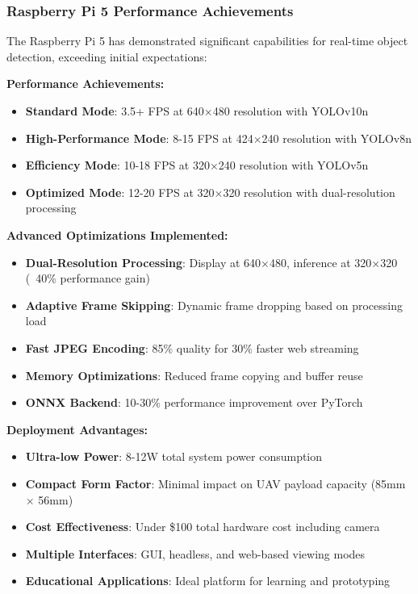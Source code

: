 \documentclass[11pt,a4paper]{article}
\begin{document}
\subsubsection{Raspberry Pi 5 Performance Achievements}

The Raspberry Pi 5 has demonstrated significant capabilities for real-time object detection, exceeding initial expectations:

\textbf{Performance Achievements:}
\begin{itemize}
    \item \textbf{Standard Mode}: 3.5+ FPS at 640×480 resolution with YOLOv10n
    \item \textbf{High-Performance Mode}: 8-15 FPS at 424×240 resolution with YOLOv8n
    \item \textbf{Efficiency Mode}: 10-18 FPS at 320×240 resolution with YOLOv5n
    \item \textbf{Optimized Mode}: 12-20 FPS at 320×320 resolution with dual-resolution processing
\end{itemize}

\textbf{Advanced Optimizations Implemented:}
\begin{itemize}
    \item \textbf{Dual-Resolution Processing}: Display at 640×480, inference at 320×320 (~40\% performance gain)
    \item \textbf{Adaptive Frame Skipping}: Dynamic frame dropping based on processing load
    \item \textbf{Fast JPEG Encoding}: 85\% quality for 30\% faster web streaming
    \item \textbf{Memory Optimizations}: Reduced frame copying and buffer reuse
    \item \textbf{ONNX Backend}: 10-30\% performance improvement over PyTorch
\end{itemize}

\textbf{Deployment Advantages:}
\begin{itemize}
    \item \textbf{Ultra-low Power}: 8-12W total system power consumption
    \item \textbf{Compact Form Factor}: Minimal impact on UAV payload capacity (85mm × 56mm)
    \item \textbf{Cost Effectiveness}: Under \$100 total hardware cost including camera
    \item \textbf{Multiple Interfaces}: GUI, headless, and web-based viewing modes
    \item \textbf{Educational Applications}: Ideal platform for learning and prototyping
\end{itemize}
\end{document}
